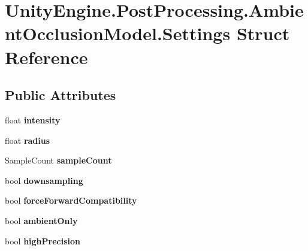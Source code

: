 \hypertarget{struct_unity_engine_1_1_post_processing_1_1_ambient_occlusion_model_1_1_settings}{}\section{Unity\+Engine.\+Post\+Processing.\+Ambient\+Occlusion\+Model.\+Settings Struct Reference}
\label{struct_unity_engine_1_1_post_processing_1_1_ambient_occlusion_model_1_1_settings}
\subsection*{Public Attributes}
\begin{DoxyCompactItemize}
\item 
\mbox{\label{struct_unity_engine_1_1_post_processing_1_1_ambient_occlusion_model_1_1_settings_a1cd0d9b8c8dc5fe2bea013beb159ba8d}} 
float {\bfseries intensity}
\item 
\mbox{\label{struct_unity_engine_1_1_post_processing_1_1_ambient_occlusion_model_1_1_settings_a42e512ddcf9b13942ed5562e0954b539}} 
float {\bfseries radius}
\item 
\mbox{\label{struct_unity_engine_1_1_post_processing_1_1_ambient_occlusion_model_1_1_settings_a04352d1f05f8e6ced64bba2c39419caa}} 
Sample\+Count {\bfseries sample\+Count}
\item 
\mbox{\label{struct_unity_engine_1_1_post_processing_1_1_ambient_occlusion_model_1_1_settings_a41b25007b636000cd9a6f2d5366a7d13}} 
bool {\bfseries downsampling}
\item 
\mbox{\label{struct_unity_engine_1_1_post_processing_1_1_ambient_occlusion_model_1_1_settings_a6c9607113231d8c992d97f63c20b52b2}} 
bool {\bfseries force\+Forward\+Compatibility}
\item 
\mbox{\label{struct_unity_engine_1_1_post_processing_1_1_ambient_occlusion_model_1_1_settings_a0404fb0cf5a1222ce61de9876ebeb7ce}} 
bool {\bfseries ambient\+Only}
\item 
\mbox{\label{struct_unity_engine_1_1_post_processing_1_1_ambient_occlusion_model_1_1_settings_a821b7fd2620df542d2d1e83536a480dc}} 
bool {\bfseries high\+Precision}
\end{DoxyCompactItemize}
